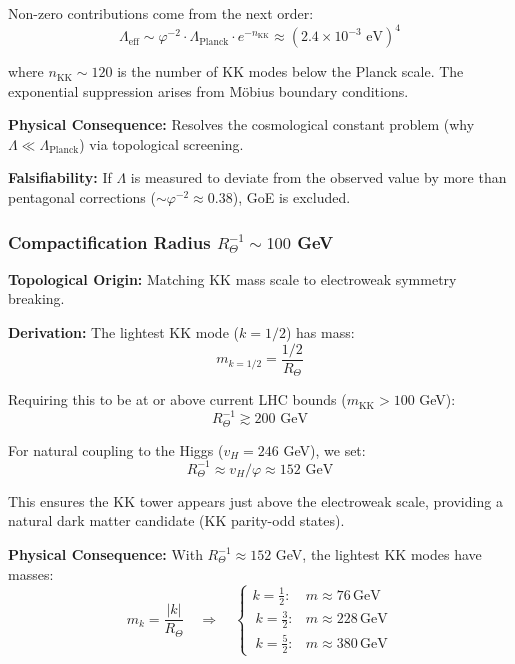 \documentclass[12pt]{article}
\begin{document}
Non-zero contributions come from the next order:
\begin{equation}
\Lambda_{\text{eff}} \sim \varphi^{-2} \cdot \Lambda_{\text{Planck}} \cdot e^{-n_{\text{KK}}} \approx (2.4 \times 10^{-3} \text{ eV})^4
\end{equation}

where $n_{\text{KK}} \sim 120$ is the number of KK modes below the Planck scale. The exponential suppression arises from M\"obius boundary conditions.

\textbf{Physical Consequence:} Resolves the cosmological constant problem (why $\Lambda \ll \Lambda_{\text{Planck}}$) via topological screening.

\textbf{Falsifiability:} If $\Lambda$ is measured to deviate from the observed value by more than pentagonal corrections ($\sim \varphi^{-2} \approx 0.38$), GoE is excluded.

\subsubsection{Compactification Radius $R_\Theta^{-1} \sim 100$ GeV}

\textbf{Topological Origin:} Matching KK mass scale to electroweak symmetry breaking.

\textbf{Derivation:} The lightest KK mode ($k = 1/2$) has mass:
\begin{equation}
m_{k=1/2} = \frac{1/2}{R_\Theta}
\end{equation}

Requiring this to be at or above current LHC bounds ($m_{\text{KK}} > 100$ GeV):
\begin{equation}
R_\Theta^{-1} \gtrsim 200 \text{ GeV}
\end{equation}

For natural coupling to the Higgs ($v_H = 246$ GeV), we set:
\begin{equation}
R_\Theta^{-1} \approx v_H / \varphi \approx 152 \text{ GeV}
\end{equation}

This ensures the KK tower appears just above the electroweak scale, providing a natural dark matter candidate (KK parity-odd states).

\textbf{Physical Consequence:} With $R_\Theta^{-1} \approx 152$ GeV, the lightest KK modes have masses:
\begin{equation}
m_k = \frac{|k|}{R_\Theta} \quad \Rightarrow \quad \begin{cases}
k = \tfrac{1}{2}: & m \approx 76\,\text{GeV} \\\
k = \tfrac{3}{2}: & m \approx 228\,\text{GeV} \\\
k = \tfrac{5}{2}: & m \approx 380\,\text{GeV}
\end{cases}
\end{equation}
\end{document}
